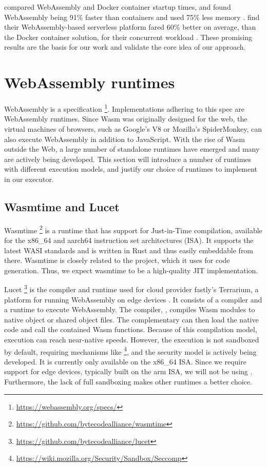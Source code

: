 \citeauthor{Mendki2020} compared WebAssembly and Docker container startup times, and found WebAssembly being 91\% faster than containers and used 75\% less memory \cite{Mendki2020}. \citeauthor{Hall2019} find their WebAssembly-based serverless platform fared 60\% better on average, than the Docker container solution, for their concurrent  workload \cite{Hall2019}. These promising results are the basis for our work and validate the core idea of our approach.


\section{WebAssembly runtimes}
\label{section:wasm-runtimes}

WebAssembly is a specification \footnote{\url{https://webassembly.org/specs/}}. Implementations adhering to this spec are WebAssembly runtimes. Since Wasm was originally designed for the web, the virtual machines of browsers, such as Google's V8 or Mozilla's SpiderMonkey, can also execute WebAssembly in addition to JavaScript. With the rise of Wasm outside the Web, a large number of standalone runtimes have emerged and many are actively being developed. This section will introduce a number of runtimes with different execution models, and justify our choice of runtimes to implement in our executor.


\subsection{Wasmtime and Lucet}

Wasmtime \footnote{\url{https://github.com/bytecodealliance/wasmtime}} is a runtime that has support for Just-in-Time compilation, available for the x86\_64 and aarch64 instruction set architectures (ISA). It supports the latest WASI standards and is written in Rust and thus easily embeddable from there.
Wasmtime is closely related to the  project, which it uses for code generation. Thus, we expect wasmtime to be a high-quality JIT implementation.

Lucet \footnote{\url{https://github.com/bytecodealliance/lucet}} is the compiler and runtime used for cloud provider fastly's Terrarium, a platform for running WebAssembly on edge devices \cite{fastly2019}. It consists of a compiler and a runtime to execute WebAssembly. The compiler, , compiles Wasm modules to native object or shared object files. The complementary  can then load the native code and call the contained Wasm functions. Because of this compilation model, execution can reach near-native speeds. However, the execution is not sandboxed by default, requiring mechanisms like  \footnote{\url{https://wiki.mozilla.org/Security/Sandbox/Seccomp}}, and the security model is actively being developed. It is currently only available on the x86\_64 ISA. Since we require support for edge devices, typically built on the arm ISA, we will not be using . Furthermore, the lack of full sandboxing makes other runtimes a better choice.

